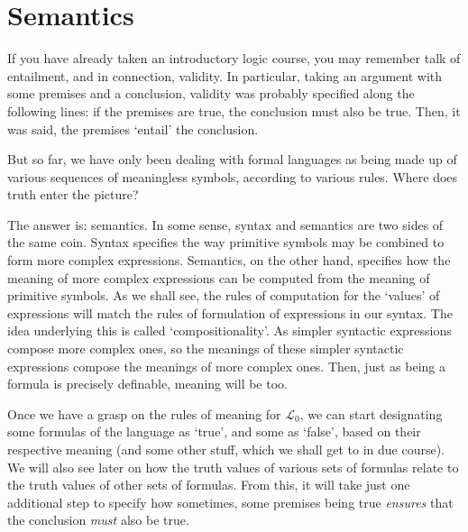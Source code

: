 \chapter{Semantics}

If you have already taken an introductory logic course, you may remember talk of entailment, and in connection, validity. In particular, taking an argument with some premises and a conclusion, validity was probably specified along the following lines: if the premises are true, the conclusion must also be true. Then, it was said, the premises `entail' the conclusion. 

But so far, we have only been dealing with formal languages as being made up of various sequences of meaningless symbols, according to various rules. Where does truth enter the picture? 

The answer is: semantics. In some sense, syntax and semantics are two sides of the same coin. Syntax specifies the way primitive symbols may be combined to form more complex expressions. Semantics, on the other hand, specifies how the meaning of more complex expressions can be computed from the meaning of primitive symbols. As we shall see, the rules of computation for the `values' of expressions will match the rules of formulation of expressions in our syntax. The idea underlying this is called `compositionality'. As simpler syntactic expressions compose more complex ones, so the meanings of these simpler syntactic expressions compose the meanings of more complex ones. Then, just as being a formula is precisely definable, meaning will be too. 

Once we have a grasp on the rules of meaning for $\mathcal{L}_0$, we can start designating some formulas of the language as `true', and some as `false', based on their respective meaning (and some other stuff, which we shall get to in due course). We will also see later on how the truth values of various sets of formulas relate to the truth values of other sets of formulas. From this, it will take just one additional step to specify how sometimes, some premises being true \textit{ensures} that the conclusion \textit{must} also be true. 


